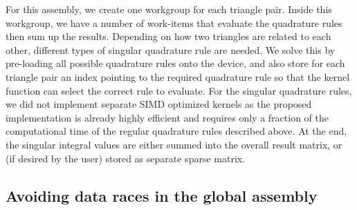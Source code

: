 For this assembly, we create one workgroup for each triangle pair. Inside this workgroup, we have a number of work-items that evaluate the quadrature rules then sum up the results. Depending on how two triangles are related to each other, different types of singular quadrature rule are needed. We solve this by pre-loading all possible quadrature rules onto the device, and also store for each triangle pair an index pointing to the required quadrature rule so that the kernel function can select the correct rule to evaluate. For the singular quadrature rules, we did not implement separate SIMD optimized kernels as the proposed implementation is already highly efficient and requires only a fraction of the computational time of the regular quadrature rules described above. At the end, the singular integral values are either summed into the overall result matrix, or (if desired by the user) stored as separate sparse matrix.

\subsection{Avoiding data races in the global assembly}

